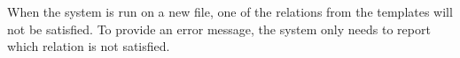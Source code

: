 When the system is run on a new file, one of the relations from the templates will not be satisfied.
To provide an error message, the system only needs to report which relation is not satisfied.

